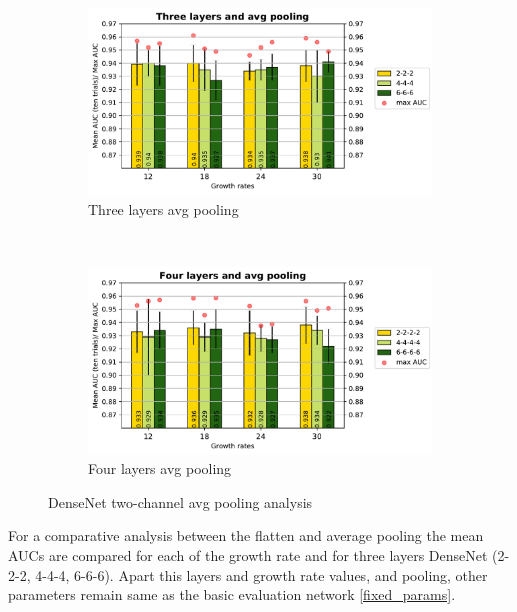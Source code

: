 \begin{figure}
    \centering
    \begin{subfigure}[b]{0.4\textwidth}
        \includegraphics[width=\textwidth]{images/densenet/simple/densenet_simple_three_layer_avg_bar}
        \caption{Three layers avg pooling }
        \label{fig:densenet_simple_three_layer_avg_bar}
    \end{subfigure}
    ~ %
    \begin{subfigure}[b]{0.4\textwidth}
        \includegraphics[width=\textwidth]{images/densenet/simple/densenet_simple_four_layer_avg_bar}
        \caption{Four layers avg pooling}
       \label{fig:densenet_simple_four_layer_avg_bar}
    \end{subfigure}        
    \caption{DenseNet two-channel avg pooling analysis}
    \label{fig:dense_avg_pooling_1}
\end{figure}

For a comparative analysis between the flatten and average pooling the mean AUCs are compared for each of the growth rate and for three layers DenseNet (2-2-2, 4-4-4, 6-6-6). Apart this layers and growth rate values, and pooling, 
other parameters remain same as the basic evaluation network \ref{fixed_params}.

